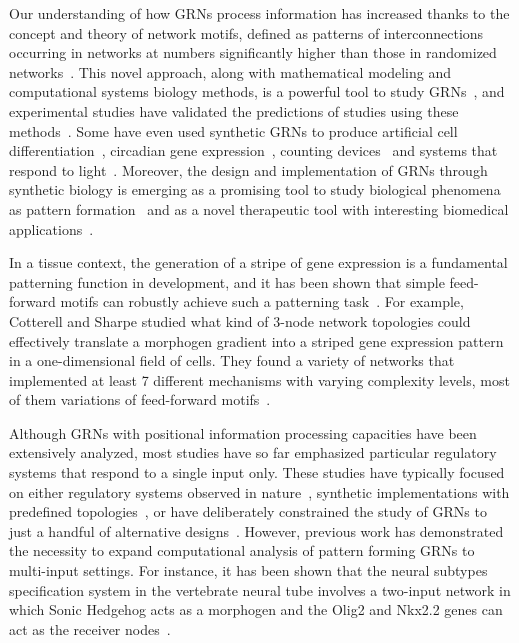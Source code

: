\documentclass[10pt,letterpaper]{article}
\begin{document}
Our understanding of how GRNs process information has increased thanks to the
concept and theory of network motifs, defined as patterns of
interconnections occurring in networks at numbers significantly higher
than those in randomized networks~\cite{Milo2002}. This novel approach, along
with mathematical modeling and computational systems biology methods, is a
powerful tool to study GRNs~\cite{kitano_computational_2002}, and
experimental studies have validated the predictions of studies using these
methods~\cite{Kalir2005,Kalir2004,Mangan2003a,ODonnell2005}.
Some have even used synthetic GRNs to produce artificial cell
differentiation~\cite{Basu2005}, circadian gene
expression~\cite{atkinson_development_2003}, counting
devices~\cite{friedland_synthetic_2009} and systems that respond to
light~\cite{gardner2012,levskaya2005}.
Moreover, the design and implementation of GRNs through synthetic biology is
emerging as a promising tool to study biological phenomena as pattern
formation~\cite{santos-moreno_using_2019} and as a novel therapeutic tool with
interesting biomedical applications~\cite{karlsson_therapeutic_2012,
higashikuni_advancing_2017,abil_synthetic_2015,healy_genetic_2019,
kitada_programming_2018}.

In a tissue context, the generation of a stripe of gene expression is a fundamental
patterning function in development, and it has been shown that simple feed-forward
motifs can robustly achieve such a patterning task~\cite{munteanu_2014}. For
example, Cotterell and Sharpe studied what kind of 3-node network topologies
could effectively translate a morphogen gradient into a striped gene expression
pattern in a one-dimensional field of cells. They found a variety of networks that
implemented at least 7 different mechanisms with varying complexity levels,
most of them variations of feed-forward motifs~\cite{Cotterell2010}.

Although GRNs with positional information processing capacities have been
extensively analyzed, most studies have so far emphasized particular
regulatory systems that respond to a single input only. These studies have
typically focused on either regulatory systems observed in
nature~\cite{vonDassow2000,Reinitz1995,Jaeger2004}, synthetic
implementations with predefined topologies~\cite{Basu2005, Schaerli2018,
Elowitz2000, barbier2020}, or have deliberately constrained the study of GRNs to just
a handful of alternative designs~\cite{munteanu_2014,Schaerli2014}. However,
previous work has demonstrated the necessity to expand computational analysis
of pattern forming GRNs to multi-input settings. For instance, it has been shown
that the neural subtypes specification system in the vertebrate neural tube involves
a  two-input network in which Sonic Hedgehog acts as a morphogen and the Olig2
and Nkx2.2 genes can act as the receiver nodes~\cite{dessaud_dynamic_2010,
balaskas2012, exelby_2021}.
\end{document}
